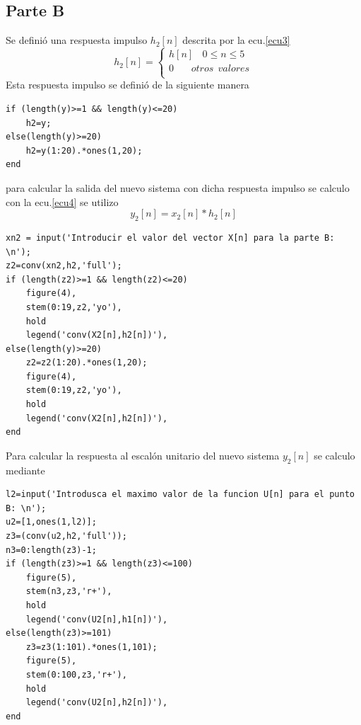 \documentclass[onecolumn]{IEEEtran}
\begin{document}
\subsection{Parte B}
\noindent
Se definió una respuesta impulso $h_2[n]$ descrita por la ecu.\ref{ecu3}
\begin{equation}\label{ecu3}
h_2 \left[ n \right] = \left\{ \begin{array}{l}
 h\left[ n \right] \ \ \ \ 0 \le n \le 5 \\
 0 \ \ \ \ \ \ \ \ otros \ \ valores \\
 \end{array} \right.    
\end{equation}
\noindent
Esta respuesta impulso se definió de la siguiente manera
\begin{verbatim}
if (length(y)>=1 && length(y)<=20)
	h2=y;
else(length(y)>=20)
	h2=y(1:20).*ones(1,20);
end
\end{verbatim}
\noindent
para calcular la salida del nuevo sistema con dicha respuesta impulso se calculo con la ecu.\ref{ecu4} se utilizo
\begin{equation}\label{ecu4}
    y_2\left[ n \right] = x_2 \left[ n \right]*h_2 \left[ n \right]
\end{equation}
\begin{verbatim}
xn2 = input('Introducir el valor del vector X[n] para la parte B: \n');
z2=conv(xn2,h2,'full');
if (length(z2)>=1 && length(z2)<=20)
	figure(4),
	stem(0:19,z2,'yo'),
    hold
    legend('conv(X2[n],h2[n])'),
else(length(y)>=20)
	z2=z2(1:20).*ones(1,20);
	figure(4),
	stem(0:19,z2,'yo'),
    hold
    legend('conv(X2[n],h2[n])'),
end
\end{verbatim}
\noindent
Para calcular la respuesta al escalón unitario del nuevo sistema $y_2\left[ n \right]$ se calculo mediante
\begin{verbatim}
l2=input('Introdusca el maximo valor de la funcion U[n] para el punto B: \n');
u2=[1,ones(1,l2)];
z3=(conv(u2,h2,'full'));
n3=0:length(z3)-1;
if (length(z3)>=1 && length(z3)<=100)
	figure(5),
	stem(n3,z3,'r+'),
    hold
    legend('conv(U2[n],h1[n])'),
else(length(z3)>=101)
    z3=z3(1:101).*ones(1,101);
    figure(5),
    stem(0:100,z3,'r+'),
    hold
    legend('conv(U2[n],h2[n])'),
end
\end{verbatim}
\end{document}
